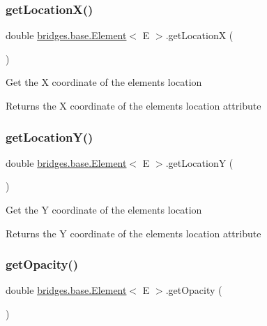 \subsubsection{\texorpdfstring{getLocationX()}{getLocationX()}}
{\footnotesize\ttfamily double \mbox{\hyperlink{classbridges_1_1base_1_1_element}{bridges.\+base.\+Element}}$<$ E $>$.get\+LocationX (\begin{DoxyParamCaption}{ }\end{DoxyParamCaption})}

Get the X coordinate of the element\textquotesingle{}s location \begin{DoxyReturn}{Returns}
the X coordinate of the element\textquotesingle{}s location attribute 
\end{DoxyReturn}
\mbox{\label{classbridges_1_1base_1_1_element_a3cfd6af5ca4cae0596845f62018ce004}} 
\subsubsection{\texorpdfstring{getLocationY()}{getLocationY()}}
{\footnotesize\ttfamily double \mbox{\hyperlink{classbridges_1_1base_1_1_element}{bridges.\+base.\+Element}}$<$ E $>$.get\+LocationY (\begin{DoxyParamCaption}{ }\end{DoxyParamCaption})}

Get the Y coordinate of the element\textquotesingle{}s location \begin{DoxyReturn}{Returns}
the Y coordinate of the element\textquotesingle{}s location attribute 
\end{DoxyReturn}
\mbox{\label{classbridges_1_1base_1_1_element_a1427af7efc2d5bc93e00a6a95d268c4d}} 
\subsubsection{\texorpdfstring{getOpacity()}{getOpacity()}}
{\footnotesize\ttfamily double \mbox{\hyperlink{classbridges_1_1base_1_1_element}{bridges.\+base.\+Element}}$<$ E $>$.get\+Opacity (\begin{DoxyParamCaption}{ }\end{DoxyParamCaption})}

